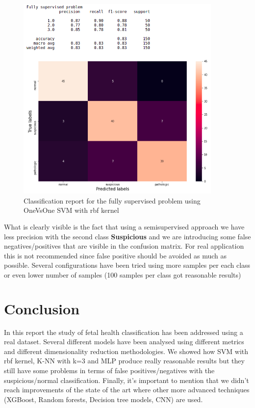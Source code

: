 \documentclass[a4paper,12pt]{article}
\begin{document}
\begin{figure}[H]
  \begin{center}
  \includegraphics[width=0.9\textwidth]{images/fully.png}
  \end{center}
  \caption{Classification report for the fully supervised problem using OneVsOne SVM with rbf kernel}
  \label{fig:fully}
\end{figure}

\noindent What is clearly visible is the fact that using a semisupervised approach we have less precision with the second class \textbf{Suspicious} and we are introducing some false negatives/positives that are visible in the confusion matrix. For real application this is not recommended since false positive should be avoided as much as possible. Several configurations have been tried using more samples per each class or even lower number of samples (100 samples per class got reasonable results)

\newpage
\section{Conclusion}

In this report the study of fetal health classification has been addressed using a real dataset. Several different models have been analysed using different metrics and different dimensionality reduction methodologies. We showed how SVM with rbf kernel, K-NN with k=3 and MLP produce really reasonable results but they still have some problems in terms of false positives/negatives with the suspicious/normal classification. Finally, it's important to mention that we didn't reach improvements of the state of the art where other more advanced techniques (XGBoost, Random forests, Decision tree models, CNN) are used. \cite{ann} \cite{cnn}
\end{document}
